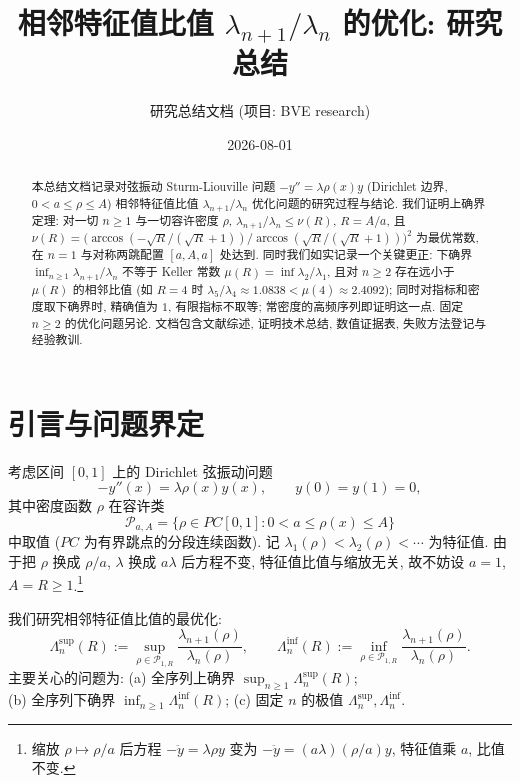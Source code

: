 \documentclass[UTF8]{ctexart}
\title{相邻特征值比值 \texorpdfstring{$\lambda_{n+1}/\lambda_n$}{lambda_{n+1}/lambda_n} 的优化: 研究总结}
\author{研究总结文档 (项目: BVE research)}
\date{2026-08-01}
\begin{document}
\maketitle

\begin{abstract}
本总结文档记录对弦振动 Sturm-Liouville 问题
$-y'' = \lambda\rho(x)y$ (Dirichlet 边界, $0 < a \leq \rho \leq A$)
相邻特征值比值 $\lambda_{n+1}/\lambda_n$ 优化问题的研究过程与结论.
我们证明上确界定理: 对一切 $n \geq 1$ 与一切容许密度 $\rho$,
$\lambda_{n+1}/\lambda_n \leq \nu(R)$, $R = A/a$,
且 $\nu(R) = \bigl(\arccos(-\sqrt{R}/(\sqrt{R}+1)) / \arccos(\sqrt{R}/(\sqrt{R}+1))\bigr)^2$
为最优常数, 在 $n = 1$ 与对称两跳配置 $[a,A,a]$ 处达到.
同时我们如实记录一个关键更正: 下确界 $\inf_{n\geq 1} \lambda_{n+1}/\lambda_n$
不等于 Keller 常数 $\mu(R) = \inf \lambda_2/\lambda_1$,
且对 $n \geq 2$ 存在远小于 $\mu(R)$ 的相邻比值 (如 $R=4$ 时
$\lambda_5/\lambda_4 \approx 1.0838 < \mu(4) \approx 2.4092$);
同时对指标和密度取下确界时, 精确值为 $1$, 有限指标不取等;
常密度的高频序列即证明这一点. 固定 $n\ge2$ 的优化问题另论.
文档包含文献综述, 证明技术总结, 数值证据表, 失败方法登记与经验教训.
\end{abstract}

\tableofcontents

\section{引言与问题界定}

考虑区间 $[0,1]$ 上的 Dirichlet 弦振动问题
\begin{equation}
	-y''(x) = \lambda\rho(x)y(x), \qquad y(0) = y(1) = 0,
\end{equation}
其中密度函数 $\rho$ 在容许类
\begin{equation}
	\mathcal{P}_{a,A} = \bigl\{ \rho \in PC[0,1] : 0 < a \leq \rho(x) \leq A \bigr\}
\end{equation}
中取值 ($PC$ 为有界跳点的分段连续函数). 记 $\lambda_1(\rho) < \lambda_2(\rho) < \cdots$
为特征值. 由于把 $\rho$ 换成 $\rho/a$, $\lambda$ 换成 $a\lambda$ 后方程不变,
特征值比值与缩放无关, 故不妨设 $a = 1$, $A = R \geq 1$.\footnote{缩放 $\rho \mapsto \rho/a$ 后方程 $-\ddot y = \lambda \rho y$ 变为 $-\ddot y = (a\lambda)(\rho/a) y$, 特征值乘 $a$, 比值不变.}

我们研究相邻特征值比值的最优化:
\begin{equation}
	\Lambda_n^{\sup}(R) := \sup_{\rho \in \mathcal{P}_{1,R}} \frac{\lambda_{n+1}(\rho)}{\lambda_n(\rho)},
	\qquad
	\Lambda_n^{\inf}(R) := \inf_{\rho \in \mathcal{P}_{1,R}} \frac{\lambda_{n+1}(\rho)}{\lambda_n(\rho)}.
\end{equation}
主要关心的问题为: (a) 全序列上确界 $\sup_{n\geq 1} \Lambda_n^{\sup}(R)$;\\
(b) 全序列下确界 $\inf_{n\geq 1} \Lambda_n^{\inf}(R)$; (c) 固定 $n$ 的极值 $\Lambda_n^{\sup}, \Lambda_n^{\inf}$.
\end{document}

